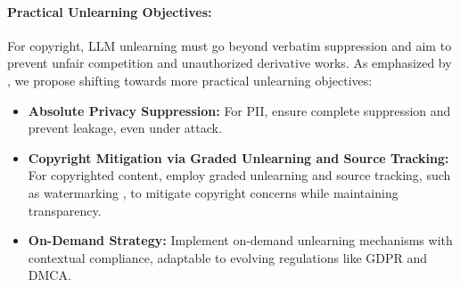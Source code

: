 \paragraph{Practical Unlearning Objectives:}
For copyright, LLM unlearning must go beyond verbatim suppression and aim to prevent unfair competition and unauthorized derivative works.
As emphasized by \citet{cooper2024machineunlearningdoesntthink}, we propose shifting towards more practical unlearning objectives:
\begin{itemize}
    \item \textbf{Absolute Privacy Suppression:} For PII, ensure complete suppression and prevent leakage, even under attack.
    \item \textbf{Copyright Mitigation via Graded Unlearning and Source Tracking:} For copyrighted content, employ graded unlearning and source tracking, such as watermarking \citep{pmlr-v202-kirchenbauer23a}, to mitigate copyright concerns while maintaining transparency.
    \item \textbf{On-Demand Strategy:} Implement on-demand unlearning mechanisms with contextual compliance, adaptable to evolving regulations like GDPR and DMCA.
\end{itemize}